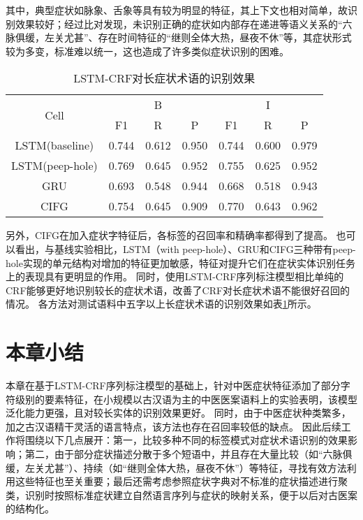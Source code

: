 其中，典型症状如脉象、舌象等具有较为明显的特征，其上下文也相对简单，故识别效果较好；经过比对发现，未识别正确的症状如内部存在递进等语义关系的“六脉俱缓，左关尤甚”、存在时间特征的“继则全体大热，昼夜不休”等，其症状形式较为多变，标准难以统一，这也造成了许多类似症状识别的困难。

\begin{table}[H]
    \centering
    \caption{LSTM-CRF对长症状术语的识别效果}
    \begin{tabular}{ccccccc}
        \toprule
            \multirow{2}{*}{Cell} & \multicolumn{3}{c}{B} & \multicolumn{3}{c}{I}\\
            \cmidrule(lr){2-4} \cmidrule(lr){5-7}
            & F1 & R & P & F1 & R & P\\
        \midrule
        {LSTM}{(baseline)} & 0.744&0.612&0.950&0.744&0.600&0.979\\
        {LSTM}{(peep-hole)} & 0.769&0.645&0.952&0.755&0.625&0.952\\
        {GRU} & 0.693&0.548&0.944&0.668&0.518&0.943\\
        {CIFG} & 0.754&0.645&0.909&0.770&0.643&0.962\\
        \bottomrule
    \end{tabular}
    \label{tab:tab2}
\end{table}
另外，CIFG在加入症状字特征后，各标签的召回率和精确率都得到了提高。
也可以看出，与基线实验相比，LSTM（with peep-hole）、GRU和CIFG三种带有peep-hole实现的单元结构对增加的特征更加敏感，特征对提升它们在症状实体识别任务上的表现具有更明显的作用。
同时，使用LSTM-CRF序列标注模型相比单纯的CRF能够更好地识别较长的症状术语，改善了CRF对长症状术语不能很好召回的情况。
各方法对测试语料中五字以上长症状术语的识别效果如表\ref{tab:tab2}所示。

\section{本章小结}
本章在基于LSTM-CRF序列标注模型的基础上，针对中医症状特征添加了部分字符级别的要素特征，在小规模以古汉语为主的中医医案语料上的实验表明，该模型泛化能力更强，且对较长实体的识别效果更好。
同时，由于中医症状种类繁多，加之古汉语精干灵活的语言特点，该方法也存在召回率较低的缺点。
因此后续工作将围绕以下几点展开：第一，比较多种不同的标签模式对症状术语识别的效果影响；第二，由于部分症状描述分散于多个短语中，并且存在大量比较（如“六脉俱缓，左关尤甚”）、持续（如“继则全体大热，昼夜不休”）等特征，寻找有效方法利用这些特征也至关重要；最后还需考虑参照症状字典对不标准的症状描述进行聚类，识别时按照标准症状建立自然语言序列与症状的映射关系，便于以后对古医案的结构化。



